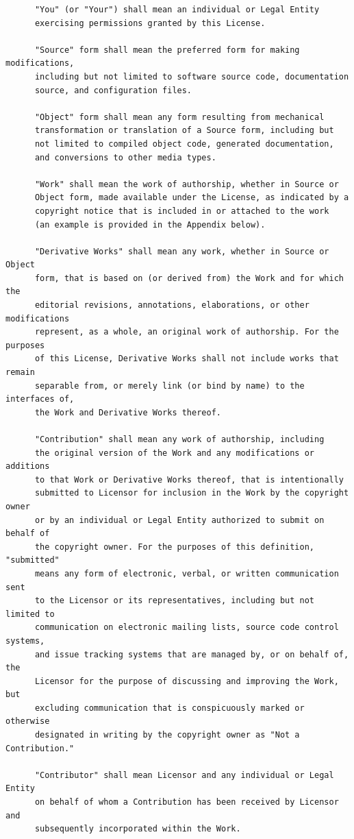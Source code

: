 \begin{dirlistbrief}
\begin{verbatim}
      "You" (or "Your") shall mean an individual or Legal Entity
      exercising permissions granted by this License.

      "Source" form shall mean the preferred form for making modifications,
      including but not limited to software source code, documentation
      source, and configuration files.

      "Object" form shall mean any form resulting from mechanical
      transformation or translation of a Source form, including but
      not limited to compiled object code, generated documentation,
      and conversions to other media types.

      "Work" shall mean the work of authorship, whether in Source or
      Object form, made available under the License, as indicated by a
      copyright notice that is included in or attached to the work
      (an example is provided in the Appendix below).

      "Derivative Works" shall mean any work, whether in Source or Object
      form, that is based on (or derived from) the Work and for which the
      editorial revisions, annotations, elaborations, or other modifications
      represent, as a whole, an original work of authorship. For the purposes
      of this License, Derivative Works shall not include works that remain
      separable from, or merely link (or bind by name) to the interfaces of,
      the Work and Derivative Works thereof.

      "Contribution" shall mean any work of authorship, including
      the original version of the Work and any modifications or additions
      to that Work or Derivative Works thereof, that is intentionally
      submitted to Licensor for inclusion in the Work by the copyright owner
      or by an individual or Legal Entity authorized to submit on behalf of
      the copyright owner. For the purposes of this definition, "submitted"
      means any form of electronic, verbal, or written communication sent
      to the Licensor or its representatives, including but not limited to
      communication on electronic mailing lists, source code control systems,
      and issue tracking systems that are managed by, or on behalf of, the
      Licensor for the purpose of discussing and improving the Work, but
      excluding communication that is conspicuously marked or otherwise
      designated in writing by the copyright owner as "Not a Contribution."

      "Contributor" shall mean Licensor and any individual or Legal Entity
      on behalf of whom a Contribution has been received by Licensor and
      subsequently incorporated within the Work.


\end{verbatim}
\end{dirlistbrief}

